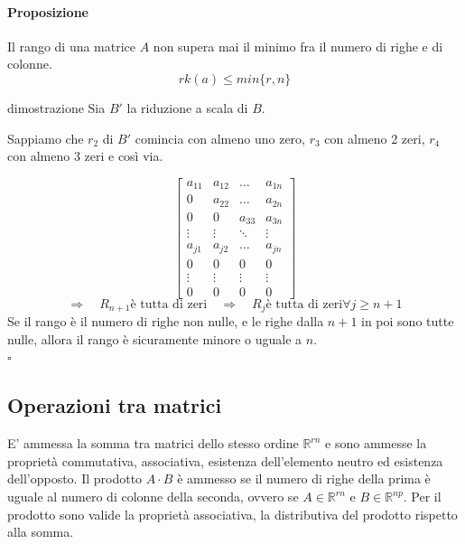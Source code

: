 \documentclass[x11names]{article}
\newcommand*{\QEDB}{\null\nobreak\hfill\ensuremath{\square}}%
\begin{document}
\paragraph{Proposizione}
Il rango di una matrice $A$ non supera mai il minimo fra il numero di righe e di colonne.
\[
rk\left(a\right) \leq min\{r,n\} 
\]

\begin{es}{dimostrazione}
Sia $B'$ la riduzione a scala di $B$.
 
Sappiamo che $r_2$ di $B'$ comincia con almeno uno zero, $r_3$ con almeno 2 zeri, $r_4$ con almeno 3 zeri e così via. 

\[
\begin{bmatrix}
	a_{11} & a_{12} & \dots & a_{1n}  \\
	0     & a_{22}& \dots & a_{2n}  \\
	0 & 0 & a_{33} &  a_{3n}  \\
	\vdots & \vdots & \ddots & \vdots \\
	a_{j1} & a_{j2} & \dots & a_{jn}  \\
	0 & 0 & 0 & 0 \\
	\vdots &\vdots &\vdots &\vdots \\
	0 & 0 & 0 & 0 
\end{bmatrix}
\] 
\[
\Rightarrow \quad R_{n+1} \text{è tutta di zeri}
\quad \Rightarrow \quad R_{j} \text{è tutta di zeri} \forall j \geq n + 1
\]
Se il rango è il numero di righe non nulle, e le righe dalla $n+1$ in poi sono tutte nulle, allora il rango è sicuramente minore o uguale a $n$. 
\\
\QEDB
\end{es}


\subsection{Operazioni tra matrici}
E' ammessa la somma tra matrici dello stesso ordine $\mathbb{R}^{rn}$ e sono ammesse la proprietà commutativa, associativa, esistenza dell'elemento neutro ed esistenza dell’opposto. Il prodotto $A\cdot B$ è ammesso se il numero di righe della prima è uguale al numero di colonne della seconda, ovvero se $A \in \mathbb{R}^{rn}$ e $B\in \mathbb{R}^{np}$. Per il prodotto sono valide la proprietà associativa, la distributiva del prodotto rispetto alla somma.
\end{document}
